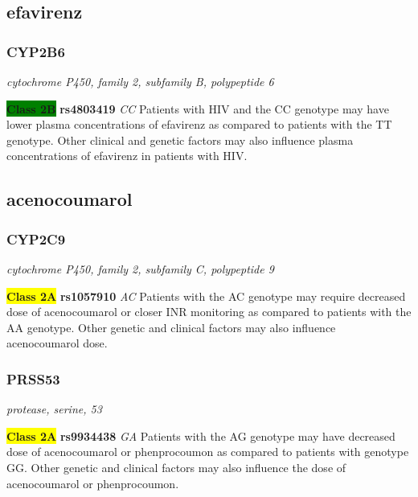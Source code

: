 \documentclass{report}
\begin{document}
\subsection{ efavirenz }\subsubsection{ CYP2B6 }
\textit{ cytochrome P450, family 2, subfamily B, polypeptide 6 } \newline





\textbf{\colorbox{green} {Class 2B}} \textbf{ rs4803419 } \textit{ CC }
Patients with HIV and the CC genotype may have lower plasma concentrations of efavirenz as compared to patients with the TT genotype. Other clinical and genetic factors may also influence plasma concentrations of efavirenz in patients with HIV.\newline

\subsection{ acenocoumarol }\subsubsection{ CYP2C9 }
\textit{ cytochrome P450, family 2, subfamily C, polypeptide 9 } \newline




\textbf{\colorbox{yellow} {Class 2A}} \textbf{ rs1057910 } \textit{ AC }
Patients with the AC genotype may require decreased dose of acenocoumarol or closer INR monitoring as compared to patients with the AA genotype. Other genetic and clinical factors may also influence acenocoumarol dose.\newline

\subsubsection{ PRSS53 }
\textit{ protease, serine, 53 } \newline




\textbf{\colorbox{yellow} {Class 2A}} \textbf{ rs9934438 } \textit{ GA }
Patients with the AG genotype may have decreased dose of acenocoumarol or phenprocoumon as compared to patients with genotype GG. Other genetic and clinical factors may also influence the dose of acenocoumarol or phenprocoumon.\newline
\end{document}
